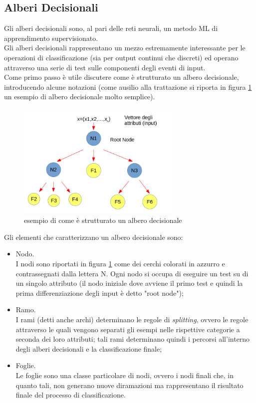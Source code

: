 
\subsection{Alberi Decisionali}
\label{alberi decisionali}
Gli alberi decisionali sono, al pari delle reti neurali, un metodo ML di apprendimento supervisionato.\\
Gli alberi decisionali rappresentano un mezzo estremamente interessante per le operazioni di classificazione (sia per output continui che discreti) ed operano attraverso una serie di test sulle componenti degli eventi di input. \\ 
Come primo passo è utile discutere come è strutturato un albero decisionale, introducendo alcune notazioni (come ausilio alla trattazione si riporta in figura \ref{schemaDT} un esempio di albero decisionale molto semplice). \\

\begin{figure} [h!]
	\centering
	\includegraphics[width=0.70\textwidth]{figs/schemaDT.png}
	\caption{esempio di come è strutturato un albero decisionale}
	\label{schemaDT}
\end{figure} 

Gli elementi che caratterizzano un albero decisionale sono:
\begin{itemize}
	\item Nodo. \\
	I nodi sono riportati in figura \ref{schemaDT} come dei cerchi colorati in azzurro e contrassegnati dalla lettera N. Ogni nodo si occupa di eseguire un test su di un singolo attributo (il nodo iniziale dove avviene il primo test e quindi la prima differenziazione degli input è detto "root node");
	\item Ramo. \\
	I rami (detti anche archi) determinano le regole di \textit{splitting}, ovvero le regole attraverso le quali vengono separati gli esempi nelle rispettive categorie a seconda dei loro attributi; tali rami determinano quindi i percorsi all'interno degli alberi decisionali e la classificazione finale;
	\item Foglie. \\
	Le foglie sono una classe particolare di nodi, ovvero i nodi finali che, in quanto tali, non generano nuove diramazioni ma rappresentano il risultato finale del processo di classificazione.
\end{itemize}

